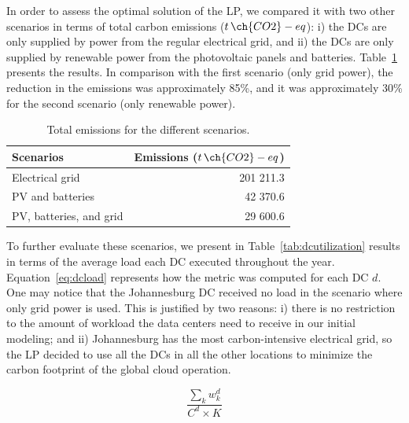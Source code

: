 In order to assess the optimal solution of the LP, we compared it with two other scenarios in terms of total carbon emissions ($t\,\ch{CO2}-eq$): i) the DCs are only supplied by power from the regular electrical grid, and ii) the DCs are only supplied by renewable power from the photovoltaic panels and batteries. Table~\ref{tab:emissions} presents the results. In comparison with the first scenario (only grid power), the reduction in the  emissions was approximately 85\%, and it was approximately 30\% for the second scenario (only renewable power).


\begin{table}[h]
\caption{Total emissions for the different scenarios.}\label{tab:emissions} \centering
\begin{tabular}{|p{5cm}|r|}
  \hline
  \textbf{Scenarios} & \textbf{Emissions ($t\,\ch{CO2}-eq$)}   \\
  \hline
  Electrical grid                    & 201 211.3    \\
  \hline
  PV and batteries  &                  42 370.6 \\ 
  \hline
  PV, batteries, and grid            &  29 600.6   \\
  \hline


\end{tabular}
\end{table}

To further evaluate these scenarios, we present in Table~\ref{tab:dcutilization} results in terms of the average load each DC executed throughout the year. Equation~\eqref{eq:dcload} represents how the metric was computed for each DC $d$. One may notice that the Johannesburg DC received no load in the scenario where only grid power is used. This is justified by two reasons: i) there is no restriction to the amount of workload the data centers need to receive in our initial modeling; and ii) Johannesburg has the most carbon-intensive electrical grid, so the LP decided to use all the DCs in all the other locations to minimize the carbon footprint of the global cloud operation.

\begin{equation}\label{eq:dcload}
\frac{\sum_k w^d_k} {C^d \times K }
\end{equation}



